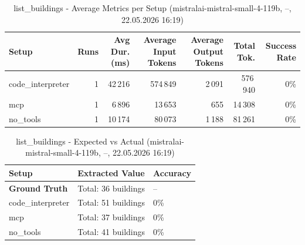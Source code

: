 \documentclass[a4paper,11pt]{article}
\begin{document}
\begin{table}[H]
\centering
\scriptsize
\caption{list\_buildings - Average Metrics per Setup (mistralai-mistral-small-4-119b, --, 22.05.2026 16:19)}
\label{tab:combined\_list\_buildings\_metrics\_20260522}
\begin{tabular}{l r r r r r r}
\toprule
Setup & Runs & Avg Dur. (ms) & Average Input Tokens & Average Output Tokens & Total Tok. & Success Rate \\
\midrule
code\_interpreter & 1 & 42\,216 & 574\,849 & 2\,091 & 576\,940 & 0\% \\
mcp & 1 & 6\,896 & 13\,653 & 655 & 14\,308 & 0\% \\
no\_tools & 1 & 10\,174 & 80\,073 & 1\,188 & 81\,261 & 0\% \\
\bottomrule
\end{tabular}
\end{table}

\begin{table}[H]
\centering
\scriptsize
\caption{list\_buildings - Detailed Runs Comparison (mistralai-mistral-small-4-119b, --, 22.05.2026 16:19)}
\end{table}

\begin{table}[H]
\centering
\scriptsize
\caption{list\_buildings - Expected vs Actual (mistralai-mistral-small-4-119b, --, 22.05.2026 16:19)}
\begin{tabular}{l l l}
\toprule
Setup & Extracted Value & Accuracy \\
\midrule
\textbf{Ground Truth} & Total: 36 buildings & -- \\
\midrule
code\_interpreter & Total: 51 buildings & 0\% \\
mcp & Total: 37 buildings & 0\% \\
no\_tools & Total: 41 buildings & 0\% \\
\bottomrule
\end{tabular}
\end{table}
\end{document}
